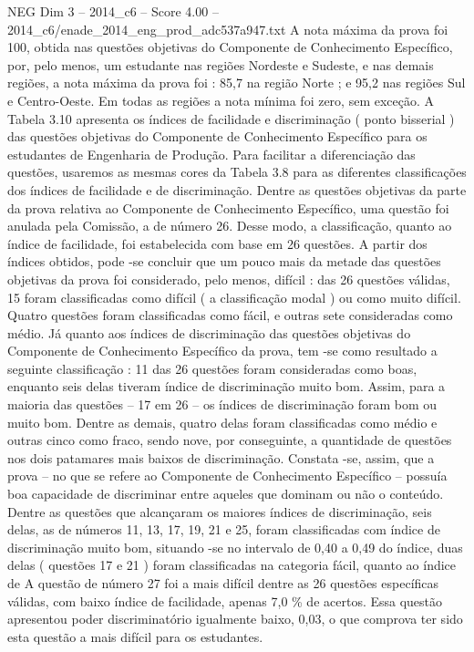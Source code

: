 \begin{textsample}{NEG Dim 3 – 2014\_c6 – Score 4.00 – 2014\_c6/enade\_2014\_eng\_prod\_adc537a947.txt}
A nota máxima da prova foi 100, obtida nas questões objetivas do Componente de Conhecimento Específico, por, pelo menos, um estudante nas regiões Nordeste e Sudeste, e nas demais regiões, a nota máxima da prova foi : 85,7 na região Norte ; e 95,2 nas regiões Sul e Centro-Oeste.
Em todas as regiões a nota mínima foi zero, sem exceção.
A Tabela 3.10 apresenta os índices de facilidade e discriminação ( ponto bisserial ) das questões objetivas do Componente de Conhecimento Específico para os estudantes de Engenharia de Produção.
Para facilitar a diferenciação das questões, usaremos as mesmas cores da Tabela 3.8 para as diferentes classificações dos índices de facilidade e de discriminação.
Dentre as questões objetivas da parte da prova relativa ao Componente de Conhecimento Específico, uma questão foi anulada pela Comissão, a de número 26.
Desse modo, a classificação, quanto ao índice de facilidade, foi estabelecida com base em 26 questões.
A partir dos índices obtidos, pode -se concluir que um pouco mais da metade das questões objetivas da prova foi considerado, pelo menos, difícil : das 26 questões válidas, 15 foram classificadas como difícil ( a classificação modal ) ou como muito difícil.
Quatro questões foram classificadas como fácil, e outras sete consideradas como médio.
Já quanto aos índices de discriminação das questões objetivas do Componente de Conhecimento Específico da prova, tem -se como resultado a seguinte classificação : 11 das 26 questões foram consideradas como boas, enquanto seis delas tiveram índice de discriminação muito bom.
Assim, para a maioria das questões – 17 em 26 – os índices de discriminação foram bom ou muito bom.
Dentre as demais, quatro delas foram classificadas como médio e outras cinco como fraco, sendo nove, por conseguinte, a quantidade de questões nos dois patamares mais baixos de discriminação.
Constata -se, assim, que a prova – no que se refere ao Componente de Conhecimento Específico – possuía boa capacidade de discriminar entre aqueles que dominam ou não o conteúdo.
Dentre as questões que alcançaram os maiores índices de discriminação, seis delas, as de números 11, 13, 17, 19, 21 e 25, foram classificadas com índice de discriminação muito bom, situando -se no intervalo de 0,40 a 0,49 do índice, duas delas ( questões 17 e 21 ) foram classificadas na categoria fácil, quanto ao índice de A questão de número 27 foi a mais difícil dentre as 26 questões específicas válidas, com baixo índice de facilidade, apenas 7,0 \% de acertos.
Essa questão apresentou poder discriminatório igualmente baixo, 0,03, o que comprova ter sido esta questão a mais difícil para os estudantes.

\end{textsample}
